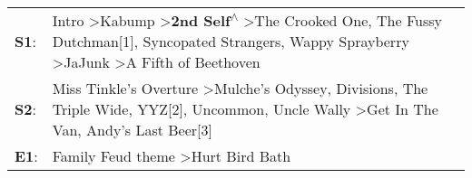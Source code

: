 \begin{supertabular}{p{0.03\textwidth}p{0.92\textwidth}}
 \textbf{S1}:  &  Intro\textsuperscript{} \textgreater \enspace Kabump\textsuperscript{} \textgreater \enspace \textbf{2nd Self\textsuperscript{$\wedge$}} \textgreater \enspace The Crooked One\textsuperscript{}, \enspace The Fussy Dutchman[1]\textsuperscript{}, \enspace Syncopated Strangers\textsuperscript{}, \enspace Wappy Sprayberry\textsuperscript{} \textgreater \enspace JaJunk\textsuperscript{} \textgreater \enspace A Fifth of Beethoven\textsuperscript{}  \enspace  \\
 \textbf{S2}:  &                                                    Miss Tinkle's Overture\textsuperscript{} \textgreater \enspace Mulche's Odyssey\textsuperscript{}, \enspace Divisions\textsuperscript{}, \enspace The Triple Wide\textsuperscript{}, \enspace YYZ[2]\textsuperscript{}, \enspace Uncommon\textsuperscript{}, \enspace Uncle Wally\textsuperscript{} \textgreater \enspace Get In The Van\textsuperscript{}, \enspace Andy's Last Beer[3]\textsuperscript{}  \enspace  \\
 \textbf{E1}:  &                                                                                                                                                                                                                                                                                                                                                                    Family Feud theme\textsuperscript{} \textgreater \enspace Hurt Bird Bath\textsuperscript{}  \enspace  \\
\end{supertabular}
